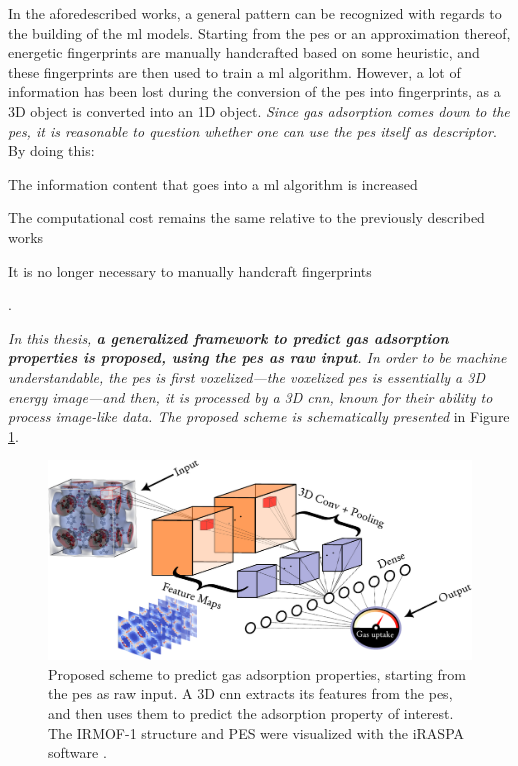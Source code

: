 In the aforedescribed works, a general pattern can be recognized with regards to
the building of the \gls{ml} models. Starting from the \gls{pes} or an
approximation thereof, energetic fingerprints are manually handcrafted based on
some heuristic, and these fingerprints are then used to train a \gls{ml}
algorithm. However, a lot of information has been lost during the conversion of
the \gls{pes} into fingerprints, as a 3D object is converted into an 1D object.
\emph{Since gas adsorption comes down to the \gls{pes}, it is reasonable to
question whether one can use the \gls{pes} itself as descriptor}.  By doing
this:
\begin{enumerate*}[label=\roman*).]
	\item The information content that goes into a \gls{ml} algorithm is increased
	\item The computational cost remains the same relative
		to the previously described works
	\item It is no longer necessary to manually handcraft fingerprints
\end{enumerate*}.

\emph{In this thesis, \textbf{a generalized framework to predict gas adsorption
properties is proposed, using the \gls{pes} as raw input}. In order to be
machine understandable, the \gls{pes} is first voxelized---the voxelized
\gls{pes} is essentially a 3D energy image---and then, it is
processed by a 3D \gls{cnn}, known for their ability to process image-like data.
The proposed scheme is schematically presented} in Figure \ref{fig:approach}.

\begin{figure}
	\centering
	\includegraphics[width=\textwidth]{fig/approach.pdf}
	\caption[Generalized framework to predict gas adsorption
	properties.]{Proposed scheme to predict gas adsorption properties, starting
	from the \gls{pes} as raw input. A 3D \gls{cnn} extracts its
	features from the \gls{pes}, and then uses them to predict
	the adsorption property of interest. The IRMOF-1 structure and PES were
	visualized with the iRASPA software \parencite{Dubbeldam2018}.}
	\label{fig:approach}
\end{figure}
